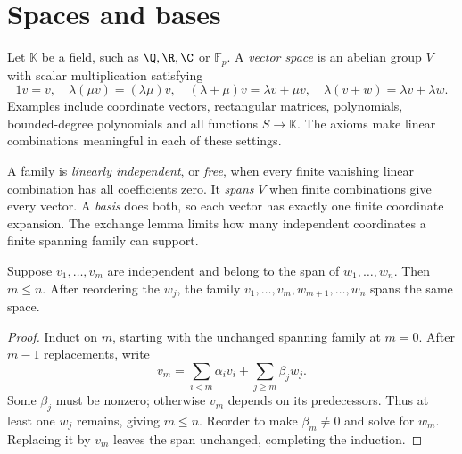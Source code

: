\section{Spaces and bases}

Let $\mathbb K$ be a field, such as $\Q,\R,\C$ or $\mathbb F_p$. A \emph{vector space} is an abelian group $V$ with scalar multiplication satisfying
\[1v=v,\quad\lambda(\mu v)=(\lambda\mu)v,\quad
(\lambda+\mu)v=\lambda v+\mu v,\quad\lambda(v+w)=\lambda v+\lambda w.
\]
Examples include coordinate vectors, rectangular matrices, polynomials, bounded-degree polynomials and all functions $S\to\mathbb K$. The axioms make linear combinations meaningful in each of these settings.

A family is \emph{linearly independent}, or \emph{free}, when every finite vanishing linear combination has all coefficients zero. It \emph{spans} $V$ when finite combinations give every vector. A \emph{basis} does both, so each vector has exactly one finite coordinate expansion. The exchange lemma limits how many independent coordinates a finite spanning family can support.

\begin{lemma}\label{linear:lem:steinitz}
Suppose $v_1,\ldots,v_m$ are independent and belong to the span of $w_1,\ldots,w_n$. Then $m\le n$. After reordering the $w_j$, the family $v_1,\ldots,v_m,w_{m+1},\ldots,w_n$ spans the same space.
\end{lemma}
\begin{proof}
Induct on $m$, starting with the unchanged spanning family at $m=0$. After $m-1$ replacements, write
\[v_m=\sum_{i<m}\alpha_iv_i+\sum_{j\ge m}\beta_jw_j.
\]
Some $\beta_j$ must be nonzero; otherwise $v_m$ depends on its predecessors. Thus at least one $w_j$ remains, giving $m\le n$. Reorder to make $\beta_m\ne0$ and solve for $w_m$. Replacing it by $v_m$ leaves the span unchanged, completing the induction.
\end{proof}


